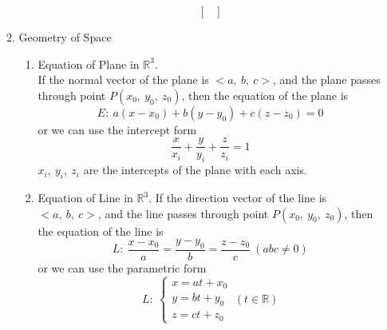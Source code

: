 \documentclass[12px]{article}
\begin{document}
\begin{enumerate}
\begin{enumerate}[(1)]
\begin{enumerate}
$$\begin{bmatrix}
            \end{bmatrix}$$
        \end{enumerate}
        \item Geometry of Space
        \begin{enumerate}
            \item Equation of Plane in $\mathbb{R}^3$.\\
            If the normal vector of the plane is $<a,\ b,\ c>$, and the plane passes through point $P(x_0,\ y_0,\ z_0)$, then the equation of the plane is
            $$E:\ a(x-x_0)+b(y-y_0)+c(z-z_0)=0$$
            or we can use the intercept form
            $$\frac{x}{x_i}+\frac{y}{y_i}+\frac{z}{z_i}=1$$
            $x_i,\ y_i,\ z_i$ are the intercepts of the plane with each axis.
            \item Equation of Line in $\mathbb{R}^3$.
            If the direction vector of the line is $<a,\ b,\ c>$, and the line passes through point $P(x_0,\ y_0,\ z_0)$, then the equation of the line is
            $$L:\ \frac{x-x_0}{a}=\frac{y-y_0}{b}=\frac{z-z_0}{c}\ (abc\neq 0)$$
            or we can use the parametric form
            $$L:\ \left\{\begin{aligned}
                x=at+x_0\\
                y=bt+y_0\\
                z=ct+z_0
            \end{aligned}\right.\ (t\in\mathbb{R})$$
        \end{enumerate}
\newpage

\end{enumerate}
\end{enumerate}
\end{document}

